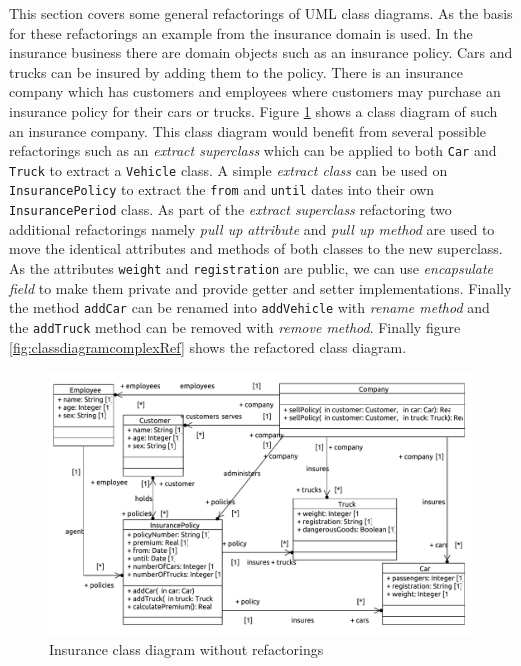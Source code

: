 \documentclass{llncs}
\begin{document}
This section covers some general refactorings of UML class diagrams. As the basis for these refactorings an example from the insurance
domain is used. In the insurance business there are domain objects such as an insurance policy. Cars and trucks can be insured by 
adding them to the policy. There is an insurance company which has customers and employees where customers may purchase an insurance policy 
for their cars or trucks. Figure \ref{fig:classdiagramcomplex} shows a class diagram of such an insurance company. This class 
diagram would benefit from several possible refactorings such as an \textit{extract superclass} which can be applied to both \lstinline|Car| 
and \lstinline|Truck| to extract a \lstinline|Vehicle| class. A simple \textit{extract class} can be used on \lstinline|InsurancePolicy| to 
extract the \lstinline|from| and \lstinline|until| dates into their own \lstinline|InsurancePeriod| class. As part of the 
\textit{extract superclass} refactoring two additional refactorings namely \textit{pull up attribute} and \textit{pull up method} are 
used to move the identical attributes and methods of both classes to the new superclass. As the 
attributes \lstinline|weight| and \lstinline|registration| are public, we can use \textit{encapsulate field} to make them private and 
provide getter and setter implementations. Finally the method \lstinline|addCar| can be renamed into \lstinline|addVehicle| with \textit{rename method} 
and the \lstinline|addTruck| method can be removed with \textit{remove method}. Finally figure \ref{fig:classdiagramcomplexRef} shows 
the refactored class diagram.

\begin{figure}[h!t]
 \centering
 \includegraphics[scale=0.5]{images/insurance/Model_Model_ClassDiagram.PDF}
 \caption{Insurance class diagram without refactorings}
 \label{fig:classdiagramcomplex}
\end{figure}
\end{document}
